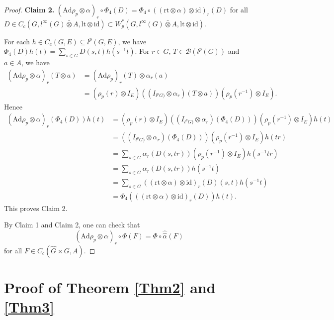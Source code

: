 \documentclass[reqno,11pt]{amsart}
\theoremstyle{plain}
\theoremstyle{definition}
\theoremstyle{remark}
\begin{document}
\begin{proof}
{\bf Claim 2.} $(\mathrm{Ad}\rho_p\otimes\alpha)_{r}\circ\Phi_{4}(D)=\Phi_{4}\circ( (\mathrm{rt}\otimes\alpha)\otimes \mathrm{id})_{r}(D)$ for all $D\in C_c(G,l^\infty(G)\bar{\otimes}A,\mathrm{lt}\otimes \mathrm{id})\subset W^*_p(G,l^\infty(G)\bar{\otimes}A,\mathrm{lt}\otimes \mathrm{id}).$

For each $h\in C_{c}(G,E)\subseteq l^{p}(G,E)$, we have $\Phi_{4}(D)h(t)=\sum_{s\in G}D(s,t)h(s^{-1}t)$. For $r\in G$, $T\in \mathcal{B}(l^p(G))$ and $a\in A$, we have 
$$\begin{aligned} (\mathrm{Ad}\rho_p\otimes\alpha)_{r}(T\otimes a)&=
(\mathrm{Ad}\rho_p)_r(T)\otimes \alpha_r(a)\\
&=(\rho_p(r)\otimes I_E)((I_{l^p{G)}}\otimes\alpha_r)(T\otimes a))(\rho_p({r^{-1}})\otimes I_E).
 \end{aligned}$$
Hence
$$\begin{aligned} (\mathrm{Ad}\rho_p\otimes\alpha)_{r}(\Phi_{4}(D))h(t)&=
(\rho_p(r)\otimes I_E)((I_{l^p{G)}}\otimes\alpha_r)(\Phi_{4}(D)))(\rho_p({r^{-1}})\otimes I_E)h(t)\\
&=((I_{l^p{G)}}\otimes\alpha_r)(\Phi_{4}(D)))(\rho_p({r^{-1}})\otimes I_E)h(tr)\\
&=\sum_{s\in G}\alpha_r(D(s,tr))(\rho_p({r^{-1}})\otimes I_E)h(s^{-1}tr)\\
&=\sum_{s\in G}\alpha_r(D(s,tr))h(s^{-1}t)\\
&=\sum_{s\in G}((\mathrm{rt}\otimes\alpha)\otimes \mathrm{id})_{r}(D)(s,t)h(s^{-1}t)\\
&=\Phi_{4}( ((\mathrm{rt}\otimes\alpha)\otimes \mathrm{id})_{r}(D))h(t).
 \end{aligned}$$
This proves Claim 2.

By Claim 1 and Claim 2, one can check that $$(\mathrm{Ad}\rho_p\otimes\alpha)_r\circ\Phi(F)=\Phi\circ\hat{\hat{\alpha}}(F)$$ for all $F\in C_c(\hat{G}\times G,A)$.
\end{proof}










\section{Proof of Theorem \ref{Thm2} and \ref{Thm3}}
\end{document}
